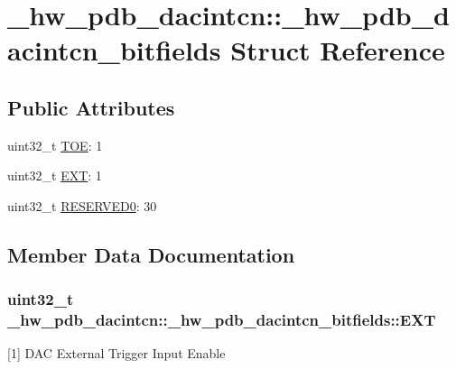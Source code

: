 \hypertarget{struct__hw__pdb__dacintcn_1_1__hw__pdb__dacintcn__bitfields}{}\section{\+\_\+hw\+\_\+pdb\+\_\+dacintcn\+:\+:\+\_\+hw\+\_\+pdb\+\_\+dacintcn\+\_\+bitfields Struct Reference}
\label{struct__hw__pdb__dacintcn_1_1__hw__pdb__dacintcn__bitfields}
\subsection*{Public Attributes}
\begin{DoxyCompactItemize}
\item 
uint32\+\_\+t \hyperlink{struct__hw__pdb__dacintcn_1_1__hw__pdb__dacintcn__bitfields_ae94340eec727b3cc394868dbc9d22be7}{T\+OE}\+: 1
\item 
uint32\+\_\+t \hyperlink{struct__hw__pdb__dacintcn_1_1__hw__pdb__dacintcn__bitfields_ab6263c94a00634266b2e02d4d1f9d2b3}{E\+XT}\+: 1
\item 
uint32\+\_\+t \hyperlink{struct__hw__pdb__dacintcn_1_1__hw__pdb__dacintcn__bitfields_a0328d6f9b6c3afc60e07a19ce7ea6b51}{R\+E\+S\+E\+R\+V\+E\+D0}\+: 30
\end{DoxyCompactItemize}


\subsection{Member Data Documentation}
\subsubsection[{\texorpdfstring{E\+XT}{EXT}}]{\setlength{\rightskip}{0pt plus 5cm}uint32\+\_\+t \+\_\+hw\+\_\+pdb\+\_\+dacintcn\+::\+\_\+hw\+\_\+pdb\+\_\+dacintcn\+\_\+bitfields\+::\+E\+XT}\hypertarget{struct__hw__pdb__dacintcn_1_1__hw__pdb__dacintcn__bitfields_ab6263c94a00634266b2e02d4d1f9d2b3}{}\label{struct__hw__pdb__dacintcn_1_1__hw__pdb__dacintcn__bitfields_ab6263c94a00634266b2e02d4d1f9d2b3}
\mbox{[}1\mbox{]} D\+AC External Trigger Input Enable 
